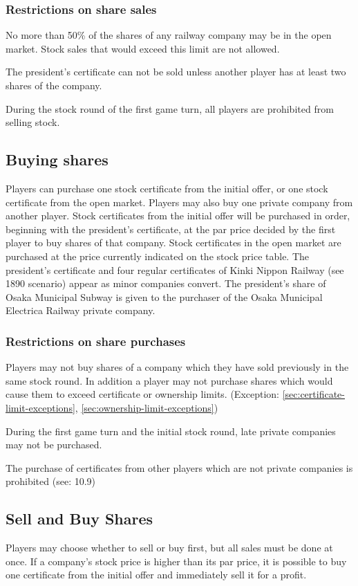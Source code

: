 \documentclass{article}
\begin{document}
\begin{CJK}{UTF8}{min}
\begin{multicols}{2}
\subsubsection{Restrictions on share sales}
\label{sr-sell-restrictions}
No more than 50\% of the shares of any railway company may be in the
open market. Stock sales that would exceed this limit are not
allowed.

The president's certificate can not be sold unless another player
has at least two shares of the company.

During the stock round of the first game turn, all players are
prohibited from selling stock.

\subsection{Buying shares} \label{sr-buy}
Players can purchase one stock certificate from the initial offer, or
one stock certificate from the open market. Players may also buy one
private company from another player.  Stock certificates from the
initial offer will be purchased in order, beginning with the
president's certificate, at the par price decided by the first player
to buy shares of that company. Stock certificates in the open market
are purchased at the price currently indicated on the stock price
table. The president's certificate and four regular certificates of
Kinki Nippon Railway (see 1890 scenario) appear as minor companies
convert. The president's share of Osaka Municipal Subway is given to the
purchaser of the Osaka Municipal Electrica Railway private company.

\subsubsection{Restrictions on share purchases}
Players may not buy shares of a company which they have sold
previously in the same stock round. In addition a player may not
purchase shares which would cause them to exceed certificate or
ownership limits. (Exception: \autoref{sec:certificate-limit-exceptions},
\autoref{sec:ownership-limit-exceptions})

During the first game turn and the initial stock round, late private
companies may not be purchased.

The purchase of certificates from other players which are not private
companies is prohibited (see: 10.9)

\subsection{Sell and Buy Shares} \label{sr-sell-buy}
Players may choose whether to sell or buy first, but all sales must be
done at once. If a company's stock price is higher than its par price,
it is possible to buy one certificate from the initial offer and
immediately sell it for a profit.


\end{multicols}
\end{CJK}
\end{document}
